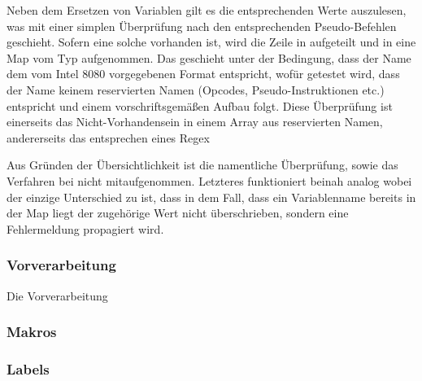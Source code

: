 Neben dem Ersetzen von Variablen gilt es die entsprechenden Werte auszulesen, was mit einer simplen Überprüfung nach den entsprechenden Pseudo-Befehlen geschieht. Sofern eine solche vorhanden ist, wird die Zeile in aufgeteilt und in eine Map vom Typ  aufgenommen. Das geschieht unter der Bedingung, dass der Name dem vom Intel 8080 vorgegebenen Format entspricht, wofür getestet wird, dass der Name keinem reservierten Namen (Opcodes, Pseudo-Instruktionen etc.) entspricht und einem vorschriftsgemäßen Aufbau folgt. Diese Überprüfung ist einerseits das Nicht-Vorhandensein in einem Array aus reservierten Namen, andererseits das entsprechen eines Regex 

Aus Gründen der Übersichtlichkeit ist die namentliche Überprüfung, sowie das Verfahren bei  nicht mitaufgenommen. Letzteres funktioniert beinah analog wobei der einzige Unterschied zu  ist, dass in dem Fall, dass ein Variablenname bereits in der Map liegt der zugehörige Wert nicht überschrieben, sondern eine Fehlermeldung propagiert wird.

\subsubsection{Vorverarbeitung}

Die Vorverarbeitung 

\subsubsection{Makros}

\subsubsection{Labels}


